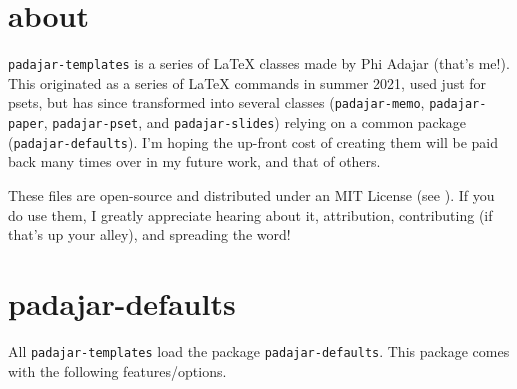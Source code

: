 \documentclass[11pt]{padajar-memo}
\date         {\today}
\begin{document}
\section*{about}

\texttt{padajar-templates} is a series of \LaTeX{} classes made by Phi Adajar (that's me!). This originated as a series of \LaTeX{} commands in summer 2021, used just for psets, but has since transformed into several classes (\texttt{padajar-memo}, \texttt{padajar-paper}, \texttt{padajar-pset}, and \texttt{padajar-slides}) relying on a common package (\texttt{padajar-defaults}). I'm hoping the up-front cost of creating them will be paid back many times over in my future work, and that of others.

These files are open-source and distributed under an MIT License (see ). If you do use them, I greatly appreciate hearing about it, attribution, contributing (if that's up your alley), and spreading the word!

\renewcommand{\contentsname}{contents}
\tableofcontents

\clearpage

\section{padajar-defaults}
All \texttt{padajar-templates} load the package \texttt{padajar-defaults}. This package comes with the following features/options.
\end{document}
